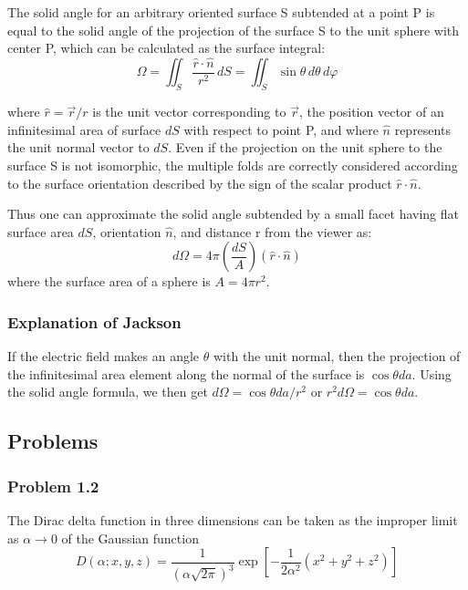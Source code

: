 The solid angle for an arbitrary oriented surface S subtended at a point P is equal to
the solid angle of the projection of the surface S to the unit sphere with center P,
which can be calculated as the surface integral:
$$
\Omega =\iint _{S} \frac{\hat{r}\cdot\hat{n}}{r^2} \,dS
= \iint_{S} \sin \theta \,d\theta \,d\varphi
$$

where $\hat{r} = \vec{r}/r$ is the unit vector corresponding to $\vec {r}$,
the position vector of an infinitesimal area of surface $dS$ with respect to point P,
and where $\hat{n}$ represents the unit normal vector to $dS$.
Even if the projection on the unit sphere to the surface S is not isomorphic,
the multiple folds are correctly considered according to the surface orientation
described by the sign of the scalar product $\hat{r}\cdot\hat{n}$.

Thus one can approximate the solid angle subtended by a small facet having flat surface area
$dS$, orientation $\hat{n}$, and distance r from the viewer as:
$$
d\Omega = 4\pi \left( \frac{dS}{A} \right) (\hat{r}\cdot\hat{n})
$$
where the surface area of a sphere is $A = 4\pi r^2$.


\subsubsection{Explanation of Jackson}

If the electric field makes an angle $\theta$ with the unit normal, then the projection of the
infinitesimal area element along the normal of the surface is $\cos\theta da$.
Using the solid angle formula, we then get $d\Omega = \cos\theta da / r^2$ or
$r^2 d\Omega = \cos\theta da$.



\subsection{Problems}

\subsubsection{Problem 1.2}


The Dirac delta function in three dimensions can be taken as the improper limit as $\alpha \rightarrow 0$ of the
Gaussian function
$$
D\left(\alpha ; x, y, z \right) =
    \frac{1}{\left(\alpha \sqrt{2\pi}\right)^3}
    \exp{ \left[ -\frac{1}{2\alpha^2} \left( x^2 + y^2 + z^2 \right) \right] }
$$

